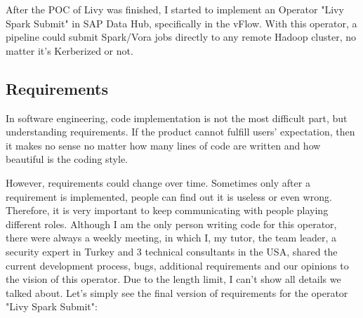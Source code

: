 \documentclass[article,colorback,accentcolor=tud4c]{tudreport}
\begin{document}
After the POC of Livy was finished, I started to implement an Operator "Livy Spark Submit" in SAP Data Hub, specifically in the vFlow. With this operator, a pipeline could submit Spark/Vora jobs directly to any remote Hadoop cluster, no matter it's Kerberized or not. 

	\subsection{Requirements}
	In software engineering, code implementation is not the most difficult part, but understanding requirements. If the product cannot fulfill users' expectation, then it makes no sense no matter how many lines of code are written and how beautiful is the coding style. 
	
	However, requirements could change over time. Sometimes only after a requirement is implemented, people can find out it is useless or even wrong. Therefore, it is very important to keep communicating with people playing different roles. Although I am the only person writing code for this operator, there were always a weekly meeting, in which I, my tutor, the team leader, a security expert in Turkey and 3 technical consultants in the USA, shared the current development process, bugs, additional requirements and our opinions to the vision of this operator. Due to the length limit, I can't show all details we talked about. Let's simply see the final version of requirements for the operator "Livy Spark Submit":
	
\end{document}
